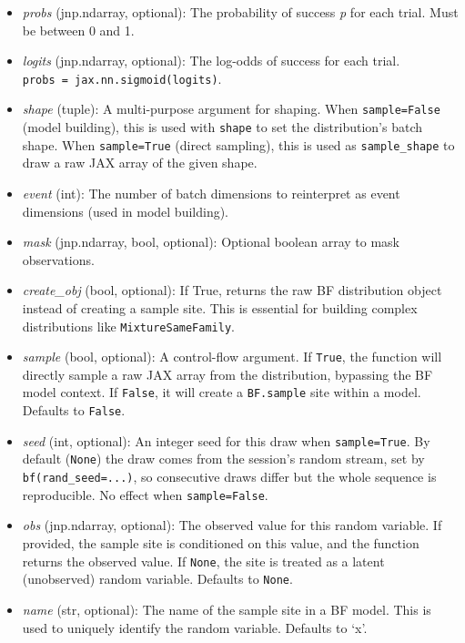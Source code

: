 \documentclass[
  letterpaper,
  DIV=11,
  numbers=noendperiod]{scrartcl}
\begin{document}
\begin{itemize}
\item
  \emph{probs} (jnp.ndarray, optional): The probability of success
  \emph{p} for each trial. Must be between 0 and 1.
\item
  \emph{logits} (jnp.ndarray, optional): The log-odds of success for
  each trial. \texttt{probs\ =\ jax.nn.sigmoid(logits)}.
\item
  \emph{shape} (tuple): A multi-purpose argument for shaping. When
  \texttt{sample=False} (model building), this is used with
  \texttt{shape} to set the distribution's batch shape. When
  \texttt{sample=True} (direct sampling), this is used as
  \texttt{sample\_shape} to draw a raw JAX array of the given shape.
\item
  \emph{event} (int): The number of batch dimensions to reinterpret as
  event dimensions (used in model building).
\item
  \emph{mask} (jnp.ndarray, bool, optional): Optional boolean array to
  mask observations.
\item
  \emph{create\_obj} (bool, optional): If True, returns the raw BF
  distribution object instead of creating a sample site. This is
  essential for building complex distributions like
  \texttt{MixtureSameFamily}.
\item
  \emph{sample} (bool, optional): A control-flow argument. If
  \texttt{True}, the function will directly sample a raw JAX array from
  the distribution, bypassing the BF model context. If \texttt{False},
  it will create a \texttt{BF.sample} site within a model. Defaults to
  \texttt{False}.
\item
  \emph{seed} (int, optional): An integer seed for this draw when
  \texttt{sample=True}. By default (\texttt{None}) the draw comes from
  the session's random stream, set by \texttt{bf(rand\_seed=...)}, so
  consecutive draws differ but the whole sequence is reproducible. No
  effect when \texttt{sample=False}.
\item
  \emph{obs} (jnp.ndarray, optional): The observed value for this random
  variable. If provided, the sample site is conditioned on this value,
  and the function returns the observed value. If \texttt{None}, the
  site is treated as a latent (unobserved) random variable. Defaults to
  \texttt{None}.
\item
  \emph{name} (str, optional): The name of the sample site in a BF
  model. This is used to uniquely identify the random variable. Defaults
  to `x'.
\end{itemize}
\end{document}

